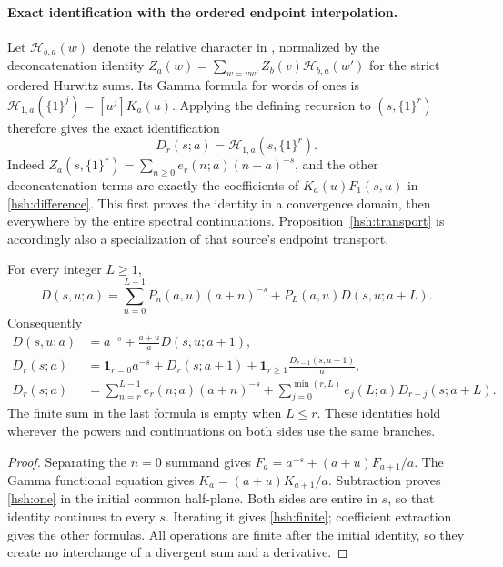 \paragraph{Exact identification with the ordered endpoint interpolation.}
Let $\mathcal H_{b,a}(w)$ denote the relative character in
\cite{RepoIndependent}, normalized by the deconcatenation identity
$Z_a(w)=\sum_{w=vw'}Z_b(v)\mathcal H_{b,a}(w')$ for the
strict ordered Hurwitz sums.  Its Gamma formula for words of ones is
$\mathcal H_{1,a}(\{1\}^j)=[u^j]K_a(u)$.  Applying the defining
recursion to $(s,\{1\}^r)$ therefore gives the exact identification
\begin{equation}\label{hsh:relativecharacter}
          D_r(s;a)=\mathcal H_{1,a}(s,\{1\}^r).
\end{equation}
Indeed $Z_a(s,\{1\}^r)=\sum_{n\geq0}e_r(n;a)(n+a)^{-s}$,
and the other deconcatenation terms are exactly the coefficients
of $K_a(u)F_1(s,u)$ in \eqref{hsh:difference}.  This first proves
the identity in a convergence domain, then everywhere by the entire
spectral continuations.  Proposition~\ref{hsh:transport} is accordingly
also a specialization of that source's endpoint transport.

\begin{proposition}\label{hsh:transport}
For every integer $L\geq1$,
\begin{equation}\label{hsh:finite}
 D(s,u;a)=\sum_{n=0}^{L-1}P_n(a,u)(a+n)^{-s}
                       +P_L(a,u)D(s,u;a+L).
\end{equation}
Consequently
\begin{align}
 D(s,u;a)&=a^{-s}+\frac{a+u}{a}D(s,u;a+1),
                                                     \label{hsh:one}\\
 D_r(s;a)&=\mathbf1_{r=0}a^{-s}+D_r(s;a+1)
                      +\mathbf1_{r\geq1}\frac{D_{r-1}(s;a+1)}a,
                                                     \label{hsh:depthshift}\\
 D_r(s;a)&=\sum_{n=r}^{L-1}e_r(n;a)(a+n)^{-s}
          +\sum_{j=0}^{\min(r,L)}e_j(L;a)D_{r-j}(s;a+L).
                                                     \label{hsh:depthfinite}
\end{align}
The finite sum in the last formula is empty when $L\leq r$.
These identities hold wherever the powers and continuations on both
sides use the same branches.
\end{proposition}

\begin{proof}
Separating the $n=0$ summand gives
$F_a=a^{-s}+(a+u)F_{a+1}/a$.  The Gamma functional equation gives
$K_a=(a+u)K_{a+1}/a$.  Subtraction proves
\eqref{hsh:one} in the initial common half-plane.  Both sides are
entire in $s$, so that identity continues to every $s$.  Iterating it
gives \eqref{hsh:finite}; coefficient extraction gives the other
formulas.  All operations are finite after the initial identity, so
they create no interchange of a divergent sum and a derivative.
\end{proof}

